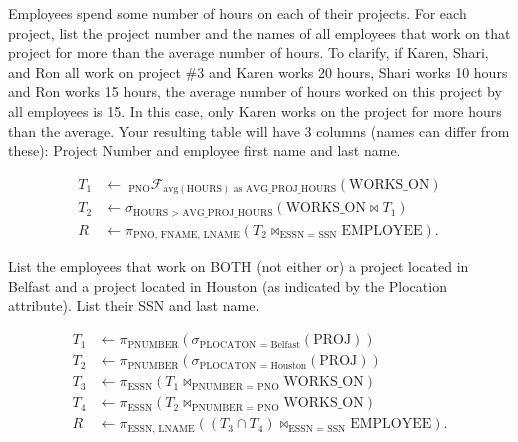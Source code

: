\documentclass[
  coursecode={CMPE 332},
  assignmentname={Relational Algebra Assignment},
  studentnumber=20053722,
  name={Bryan Hoang},
  draft,
]{
  ltxanswer%
}
\begin{document}
\begin{questions}
    \question[2] Employees spend some number of hours on each of their projects. For each project, list the project number and the names of all employees that work on that project for more than the average number of hours. To clarify, if Karen, Shari, and Ron all work on project \#3 and Karen works 20 hours, Shari works 10 hours and Ron works 15 hours, the average number of hours worked on this project by all employees is 15.  In this case, only Karen works on the project for more hours than the average. Your resulting table will have 3 columns (names can differ from these): Project Number and employee first name and last name.
    \begin{solution}
      \begin{align*}
        T_{1} &\leftarrow\ _{\text{PNO}} \mathcal{F}_{\mathrm{avg}(\text{HOURS})\text{ as AVG\_PROJ\_HOURS}}(\text{WORKS\_ON}) \\
        T_{2} &\leftarrow \sigma_{\text{HOURS > AVG\_PROJ\_HOURS}}(\text{WORKS\_ON} \bowtie T_{1})                             \\
        R     &\leftarrow \pi_{\text{PNO, FNAME, LNAME}}(T_{2} \bowtie_{\text{ESSN = SSN}} \text{EMPLOYEE}).
      \end{align*}
    \end{solution}

    \question[2] List the employees that work on BOTH (not either or) a project located in Belfast and a project located in Houston (as indicated by the Plocation attribute). List their SSN and last name.
    \begin{solution}
      \begin{align*}
        T_{1} &\leftarrow \pi_{\text{PNUMBER}}(\sigma_{\text{PLOCATON = Belfast}}(\text{PROJ}))                     \\
        T_{2} &\leftarrow \pi_{\text{PNUMBER}}(\sigma_{\text{PLOCATON = Houston}}(\text{PROJ}))                     \\
        T_{3} &\leftarrow \pi_{\text{ESSN}}(T_{1} \bowtie_{\text{PNUMBER = PNO}} \text{WORKS\_ON})                  \\
        T_{4} &\leftarrow \pi_{\text{ESSN}}(T_{2} \bowtie_{\text{PNUMBER = PNO}} \text{WORKS\_ON})                  \\
        R     &\leftarrow \pi_{\text{ESSN, LNAME}}((T_{3} \cap T_{4}) \bowtie_{\text{ESSN = SSN}} \text{EMPLOYEE}).
      \end{align*}
    \end{solution}


\end{questions}
\end{document}
